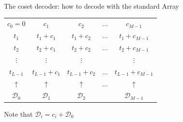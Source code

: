 \begin{parag}{The coset decoder: how to decode with the standard Array}
     \begin{center}
    \begin{tabular}{|ccccc}
	    $c_0 = 0$ & $c_1$ & $c_2$ & $\ldots$ & $c_{M-1}$  \\
	    $t_1$ & $t_1 + c_1$ & $t_1 + c_2$ & $\ldots$ & $t_1 +c_{M-1}$  \\
	    $t_2$ & $t_2 + c_1$ & $t_2 + c_2$ & $\ldots$ & $t_2 + c_{M-1}$ \\
	    $\vdots$ & $\vdots$ & $\vdots$ &  & $\vdots$ \\
	    $t_{L-1}$ & $t_{L-1} + c_1$ & $t_{L-1} + c_2$ & $\ldots$ & $t_{L-1} + c_{M-1}$  \\
	    \hline 
	    $\uparrow$ &$\uparrow$ &$\uparrow$ & $\ldots$ &$\uparrow$ \\
	    $\mathcal{D}_0$ &$\mathcal{D}_1$& $\mathcal{D}_2$& & $\mathcal{D}_{M-1}$ 
    \end{tabular}
    \end{center}
    Note that $\mathcal{D}_i =  c_i + \mathcal{D}_0$
\end{parag}


